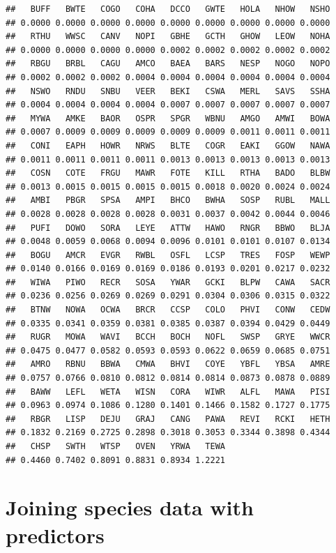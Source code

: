 \documentclass[12pt,]{book}
\begin{document}
\begin{verbatim}
##   BUFF   BWTE   COGO   COHA   DCCO   GWTE   HOLA   NHOW   NSHO 
## 0.0000 0.0000 0.0000 0.0000 0.0000 0.0000 0.0000 0.0000 0.0000 
##   RTHU   WWSC   CANV   NOPI   GBHE   GCTH   GHOW   LEOW   NOHA 
## 0.0000 0.0000 0.0000 0.0000 0.0002 0.0002 0.0002 0.0002 0.0002 
##   RBGU   BRBL   CAGU   AMCO   BAEA   BARS   NESP   NOGO   NOPO 
## 0.0002 0.0002 0.0002 0.0004 0.0004 0.0004 0.0004 0.0004 0.0004 
##   NSWO   RNDU   SNBU   VEER   BEKI   CSWA   MERL   SAVS   SSHA 
## 0.0004 0.0004 0.0004 0.0004 0.0007 0.0007 0.0007 0.0007 0.0007 
##   MYWA   AMKE   BAOR   OSPR   SPGR   WBNU   AMGO   AMWI   BOWA 
## 0.0007 0.0009 0.0009 0.0009 0.0009 0.0009 0.0011 0.0011 0.0011 
##   CONI   EAPH   HOWR   NRWS   BLTE   COGR   EAKI   GGOW   NAWA 
## 0.0011 0.0011 0.0011 0.0011 0.0013 0.0013 0.0013 0.0013 0.0013 
##   COSN   COTE   FRGU   MAWR   FOTE   KILL   RTHA   BADO   BLBW 
## 0.0013 0.0015 0.0015 0.0015 0.0015 0.0018 0.0020 0.0024 0.0024 
##   AMBI   PBGR   SPSA   AMPI   BHCO   BWHA   SOSP   RUBL   MALL 
## 0.0028 0.0028 0.0028 0.0028 0.0031 0.0037 0.0042 0.0044 0.0046 
##   PUFI   DOWO   SORA   LEYE   ATTW   HAWO   RNGR   BBWO   BLJA 
## 0.0048 0.0059 0.0068 0.0094 0.0096 0.0101 0.0101 0.0107 0.0134 
##   BOGU   AMCR   EVGR   RWBL   OSFL   LCSP   TRES   FOSP   WEWP 
## 0.0140 0.0166 0.0169 0.0169 0.0186 0.0193 0.0201 0.0217 0.0232 
##   WIWA   PIWO   RECR   SOSA   YWAR   GCKI   BLPW   CAWA   SACR 
## 0.0236 0.0256 0.0269 0.0269 0.0291 0.0304 0.0306 0.0315 0.0322 
##   BTNW   NOWA   OCWA   BRCR   CCSP   COLO   PHVI   CONW   CEDW 
## 0.0335 0.0341 0.0359 0.0381 0.0385 0.0387 0.0394 0.0429 0.0449 
##   RUGR   MOWA   WAVI   BCCH   BOCH   NOFL   SWSP   GRYE   WWCR 
## 0.0475 0.0477 0.0582 0.0593 0.0593 0.0622 0.0659 0.0685 0.0751 
##   AMRO   RBNU   BBWA   CMWA   BHVI   COYE   YBFL   YBSA   AMRE 
## 0.0757 0.0766 0.0810 0.0812 0.0814 0.0814 0.0873 0.0878 0.0889 
##   BAWW   LEFL   WETA   WISN   CORA   WIWR   ALFL   MAWA   PISI 
## 0.0963 0.0974 0.1086 0.1280 0.1401 0.1466 0.1582 0.1727 0.1775 
##   RBGR   LISP   DEJU   GRAJ   CANG   PAWA   REVI   RCKI   HETH 
## 0.1832 0.2169 0.2725 0.2898 0.3018 0.3053 0.3344 0.3898 0.4344 
##   CHSP   SWTH   WTSP   OVEN   YRWA   TEWA 
## 0.4460 0.7402 0.8091 0.8831 0.8934 1.2221
\end{verbatim}

\hypertarget{joining-species-data-with-predictors}{%
\section{Joining species data with predictors}\label{joining-species-data-with-predictors}}
\end{document}
